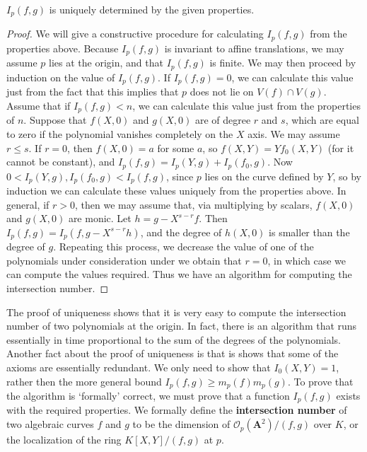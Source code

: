 \begin{theorem}
    $I_p(f,g)$ is uniquely determined by the given properties.
\end{theorem}
\begin{proof}
    We will give a constructive procedure for calculating $I_p(f,g)$ from the properties above. Because $I_p(f,g)$ is invariant to affine translations, we may assume $p$ lies at the origin, and that $I_p(f,g)$ is finite. We may then proceed by induction on the value of $I_p(f,g)$. If $I_p(f,g) = 0$, we can calculate this value just from the fact that this implies that $p$ does not lie on $V(f) \cap V(g)$. Assume that if $I_p(f,g) < n$, we can calculate this value just from the properties of $n$. Suppose that $f(X,0)$ and $g(X,0)$ are of degree $r$ and $s$, which are equal to zero if the polynomial vanishes completely on the $X$ axis. We may assume $r \leq s$. If $r = 0$, then $f(X,0) = a$ for some $a$, so $f(X,Y) = Yf_0(X,Y)$ (for it cannot be constant), and $I_p(f,g) = I_p(Y,g) + I_p(f_0,g)$. Now $0 < I_p(Y,g), I_p(f_0,g) < I_p(f,g)$, since $p$ lies on the curve defined by $Y$, so by induction we can calculate these values uniquely from the properties above. In general, if $r > 0$, then we may assume that, via multiplying by scalars, $f(X,0)$ and $g(X,0)$ are monic. Let $h = g - X^{s-r}f$. Then $I_p(f,g) = I_p(f,g-X^{s-r}h)$, and the degree of $h(X,0)$ is smaller than the degree of $g$. Repeating this process, we decrease the value of one of the polynomials under consideration under we obtain that $r = 0$, in which case we can compute the values required. Thus we have an algorithm for computing the intersection number.
\end{proof}

The proof of uniqueness shows that it is very easy to compute the intersection number of two polynomials at the origin. In fact, there is an algorithm that runs essentially in time proportional to the sum of the degrees of the polynomials. Another fact about the proof of uniqueness is that is shows that some of the axioms are essentially redundant. We only need to show that $I_0(X,Y) = 1$, rather then the more general bound $I_p(f,g) \geq m_p(f) m_p(g)$. To prove that the algorithm is `formally' correct, we must prove that a function $I_p(f,g)$ exists with the required properties. We formally define the {\bf intersection number} of two algebraic curves $f$ and $g$ to be the dimension of $\mathcal{O}_p(\mathbf{A}^2)/(f,g)$ over $K$, or the localization of the ring $K[X,Y]/(f,g)$ at $p$.


